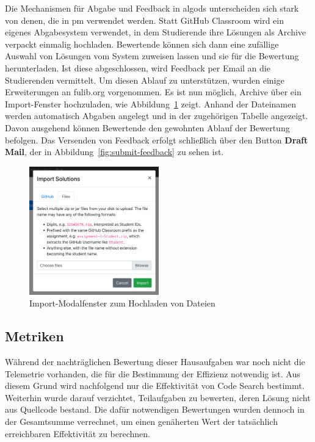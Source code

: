 Die Mechanismen für Abgabe und Feedback in \ac{algods} unterscheiden sich stark von denen, die in \ac{pm} verwendet werden.
Statt GitHub Classroom wird ein eigenes Abgabesystem verwendet, in dem Studierende ihre Lösungen als Archive verpackt einmalig hochladen.
Bewertende können sich dann eine zufällige Auswahl von Lösungen vom System zuweisen lassen und sie für die Bewertung herunterladen.
Ist diese abgeschlossen, wird Feedback per Email an die Studierenden vermittelt.
Um diesen Ablauf zu unterstützen, wurden einige Erweiterungen an fulib.org vorgenommen.
Es ist nun möglich, Archive über ein Import-Fenster hochzuladen, wie Abbildung~\ref{fig:assignment-import-files} zeigt.
Anhand der Dateinamen werden automatisch Abgaben angelegt und in der zugehörigen Tabelle angezeigt.
Davon ausgehend können Bewertende den gewohnten Ablauf der Bewertung befolgen.
Das Versenden von Feedback erfolgt schließlich über den Button \textbf{Draft Mail}, der in Abbildung~\ref{fig:submit-feedback} zu sehen ist.

\begin{figure}
    \centering
    \includegraphics[width=0.5\textwidth]{images/assignment-import-files}
    \caption{Import-Modalfenster zum Hochladen von Dateien}
    \label{fig:assignment-import-files}
\end{figure}

\subsection{Metriken}\label{subsec:algods-metrics}

Während der nachträglichen Bewertung dieser Hausaufgaben war noch nicht die Telemetrie vorhanden, die für die Bestimmung der Effizienz notwendig ist.
Aus diesem Grund wird nachfolgend nur die Effektivität von Code Search bestimmt.
Weiterhin wurde darauf verzichtet, Teilaufgaben zu bewerten, deren Lösung nicht aus Quellcode bestand.
Die dafür notwendigen Bewertungen wurden dennoch in der Gesamtsumme verrechnet, um einen genäherten Wert der tatsächlich erreichbaren Effektivität zu berechnen.

